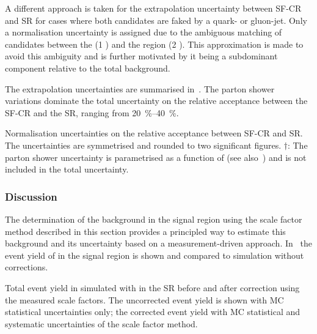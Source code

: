 A different approach is taken for the extrapolation uncertainty
between SF-CR and \hadhad SR for cases where both \tauhadvis
candidates are faked by a quark- or gluon-jet. Only a normalisation
uncertainty is assigned due to the ambiguous matching of \tauhadvis
candidates between the \lephad (1 \faketauhadvis) and the \hadhad
region (2 \faketauhadvis). This approximation is made to avoid this
ambiguity and is further motivated by it being a subdominant component
relative to the total \ttbarFakes background.

The extrapolation uncertainties are summarised
in~. The parton shower
variations dominate the total uncertainty on the relative acceptance
between the SF-CR and the SR, ranging from \SIrange{20}{40}{\percent}.

\begin{table}[htbp]
  \centering

  \caption{Normalisation uncertainties on the relative acceptance
    between SF-CR and SR. The uncertainties are symmetrised and
    rounded to two significant figures. $\dagger$: The parton shower
    uncertainty is parametrised as a function of \tauhadvis \pT (see
    also~) and is not included in the
    total uncertainty.}%
  \label{tab:ttbarSF_acceptance_uncertainty}

  
\end{table}


\subsubsection{Discussion}

The determination of the \ttbarFakes background in the \hadhad signal
region using the scale factor method described in this section
provides a principled way to estimate this background and its
uncertainty based on a measurement-driven
approach. In~ the event yield of \ttbarFakes
in the \hadhad signal region is shown and compared to \ttbar
simulation without corrections.

\begin{table}[htbp]
  \centering

  \caption{Total event yield in simulated \ttbar with \faketauhadvis
    in the \hadhad SR before and after correction using the measured
    scale factors. The uncorrected event yield is shown with MC
    statistical uncertainties only; the corrected event yield with MC
    statistical and systematic uncertainties of the scale factor method.}%
  \label{tab:ttbarSF_yields}

  
\end{table}

